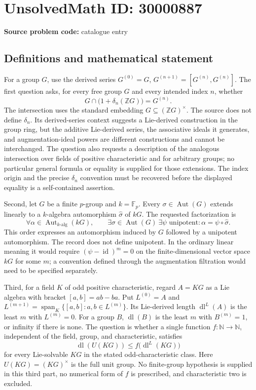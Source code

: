 \documentclass[11pt]{article}
\newcommand{\N}{\mathbb{N}}
\newcommand{\Z}{\mathbb{Z}}
\newcommand{\F}{\mathbb{F}}
\begin{document}
\section*{UnsolvedMath ID: 30000887}
\textbf{Source problem code:} catalogue entry
\subsection{Definitions and mathematical statement}
For a group \(G\), use the derived series \(G^{(0)}=G\), \(G^{(n+1)}=[G^{(n)},G^{(n)}]\). The first question asks, for every free group \(G\) and every intended index \(n\), whether
\[
 G\cap\bigl(1+\delta_n(\Z G)\bigr)=G^{(n)}.
\]
The intersection uses the standard embedding \(G\subseteq(\Z G)^\times\). The source does not define \(\delta_n\). Its derived-series context suggests a Lie-derived construction in the group ring, but the additive Lie-derived series, the associative ideals it generates, and augmentation-ideal powers are different constructions and cannot be interchanged. The question also requests a description of the analogous intersection over fields of positive characteristic and for arbitrary groups; no particular general formula or equality is supplied for those extensions. The index origin and the precise \(\delta_n\) convention must be recovered before the displayed equality is a self-contained assertion.

Second, let \(G\) be a finite \(p\)-group and \(k=\F_p\). Every \(\sigma\in\operatorname{Aut}(G)\) extends linearly to a \(k\)-algebra automorphism \(\widehat\sigma\) of \(kG\). The requested factorization is
\[
 \forall\alpha\in\operatorname{Aut}_{k\text{-alg}}(kG),\qquad
 \exists\sigma\in\operatorname{Aut}(G)\ \exists\psi\text{ unipotent}:
 \alpha=\psi\circ\widehat\sigma.
\]
This order expresses an automorphism induced by \(G\) followed by a unipotent automorphism. The record does not define unipotent. In the ordinary linear meaning it would require \((\psi-\operatorname{id})^m=0\) on the finite-dimensional vector space \(kG\) for some \(m\); a convention defined through the augmentation filtration would need to be specified separately.

Third, for a field \(K\) of odd positive characteristic, regard \(A=KG\) as a Lie algebra with bracket \([a,b]=ab-ba\). Put \(L^{(0)}=A\) and \(L^{(m+1)}=\operatorname{span}_K\{[a,b]:a,b\in L^{(m)}\}\). Its Lie-derived length \(\operatorname{dl}^L(A)\) is the least \(m\) with \(L^{(m)}=0\). For a group \(B\), \(\operatorname{dl}(B)\) is the least \(m\) with \(B^{(m)}=1\), or infinity if there is none. The question is whether a single function \(f:\N\to\N\), independent of the field, group, and characteristic, satisfies
\[
 \operatorname{dl}(U(KG))\leq f\bigl(\operatorname{dl}^L(KG)\bigr)
\]
for every Lie-solvable \(KG\) in the stated odd-characteristic class. Here \(U(KG)=(KG)^\times\) is the full unit group. No finite-group hypothesis is supplied in this third part, no numerical form of \(f\) is prescribed, and characteristic two is excluded.
\end{document}
